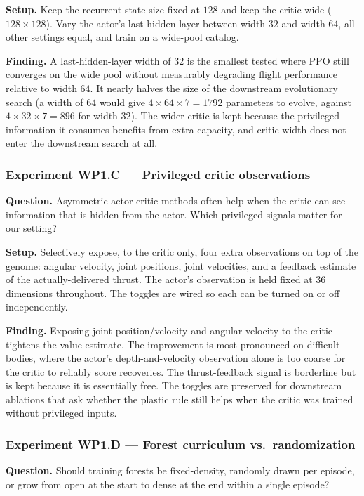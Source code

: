 \documentclass[letterpaper,10pt]{article}
\begin{document}
\textbf{Setup.} Keep the recurrent state size fixed at $128$ and keep the critic wide ($128\times128$). Vary the actor's last hidden layer between width $32$ and width $64$, all other settings equal, and train on a wide-pool catalog.

\textbf{Finding.} A last-hidden-layer width of $32$ is the smallest tested where PPO still converges on the wide pool without measurably degrading flight performance relative to width $64$. It nearly halves the size of the downstream evolutionary search (a width of $64$ would give $4 \times 64 \times 7 = 1792$ parameters to evolve, against $4 \times 32 \times 7 = 896$ for width $32$). The wider critic is kept because the privileged information it consumes benefits from extra capacity, and critic width does not enter the downstream search at all.

\subsubsection{Experiment WP1.C — Privileged critic observations}
\textbf{Question.} Asymmetric actor-critic methods often help when the critic can see information that is hidden from the actor. Which privileged signals matter for our setting?

\textbf{Setup.} Selectively expose, to the critic only, four extra observations on top of the genome: angular velocity, joint positions, joint velocities, and a feedback estimate of the actually-delivered thrust. The actor's observation is held fixed at $36$ dimensions throughout. The toggles are wired so each can be turned on or off independently.

\textbf{Finding.} Exposing joint position/velocity and angular velocity to the critic tightens the value estimate. The improvement is most pronounced on difficult bodies, where the actor's depth-and-velocity observation alone is too coarse for the critic to reliably score recoveries. The thrust-feedback signal is borderline but is kept because it is essentially free. The toggles are preserved for downstream ablations that ask whether the plastic rule still helps when the critic was trained without privileged inputs.

\subsubsection{Experiment WP1.D — Forest curriculum vs.\ randomization}
\textbf{Question.} Should training forests be fixed-density, randomly drawn per episode, or grow from open at the start to dense at the end within a single episode?
\end{document}
